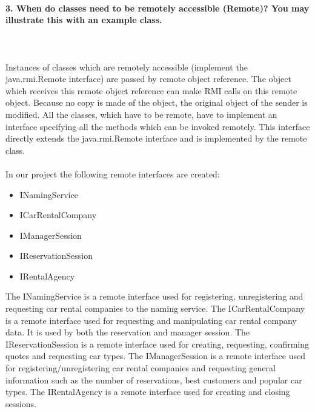 \documentclass{ds-report}
\begin{document}
	\paragraph{3. When do classes need to be remotely accessible (Remote)? You may illustrate this with an example
class.} \mbox{}\\\\
Instances of classes which are remotely accessible (implement the java.rmi.Remote interface) are passed by remote object reference. The object which receives this remote object reference can make RMI calls on this remote object. Because no copy is made of the object, the original object of the sender is modified. All the classes, which have to be remote, have to implement an interface specifying all the methods which can be invoked remotely. This interface directly extends the java.rmi.Remote interface and is implemented by the remote class.\\\\
In our project the following remote interfaces are created:
\begin{itemize}
	\item INamingService
	\item ICarRentalCompany
	\item IManagerSession
	\item IReservationSession
	\item IRentalAgency
\end{itemize} 
The INamingService is a remote interface used for registering, unregistering and requesting car rental companies to the naming service. The ICarRentalCompany is a remote interface used for requesting and manipulating car rental company data. It is used by both the reservation and manager session. The IReservationSession is a remote interface used for creating, requesting, confirming quotes and requesting car types. The IManagerSession is a remote interface used for registering/unregistering car rental companies and requesting general information such as the number of reservations, best customers and popular car types. The IRentalAgency is a remote interface used for creating and closing sessions.
\end{document}
